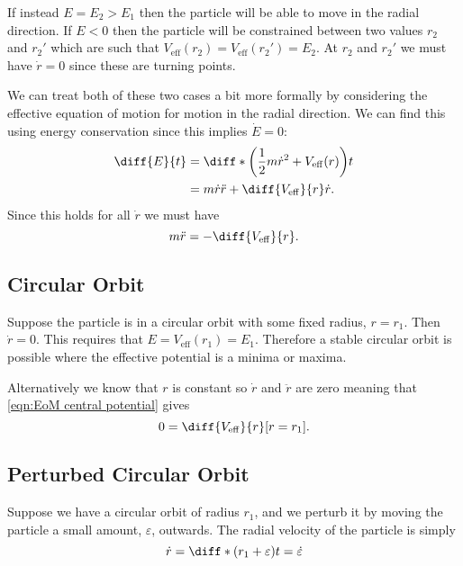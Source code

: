 \documentclass[fleqn]{NotesClass}
\newcommand*{\eff}{\mathrm{eff}}
\begin{document}
    If instead \(E = E_2 > E_1\) then the particle will be able to move in the radial direction.
    If \(E < 0\) then the particle will be constrained between two values \(r_2\) and \(r_2'\) which are such that \(V_{\eff}(r_2) = V_{\eff}(r_2') = E_2\).
    At \(r_2\) and \(r_2'\) we must have \(\dot{r} = 0\) since these are turning points.
    
    We can treat both of these two cases a bit more formally by considering the effective equation of motion for motion in the radial direction.
    We can find this using energy conservation since this implies \(\dot{E} = 0\):
    \begin{align}
        \diff{E}{t} &= \diff*{\left( \frac{1}{2}m\dot{r}^2 + V_{\eff}(r) \right)}{t}\\
        &= m\dot{r}\ddot{r} + \diff{V_{\eff}}{r}\dot{r}.
    \end{align}
    Since this holds for all \(\dot{r}\) we must have
    \begin{equation}
        m\ddot{r} = -\diff{V_{\eff}}{r}.\label{eqn:EoM central potential}
    \end{equation}
    
    \subsection{Circular Orbit}
    Suppose the particle is in a circular orbit with some fixed radius, \(r = r_1\).
    Then \(\dot{r} = 0\).
    This requires that \(E = V_{\eff}(r_1) = E_1\).
    Therefore a stable circular orbit is possible where the effective potential is a minima or maxima.
    
    Alternatively we know that \(r\) is constant so \(\dot{r}\) and \(\ddot{r}\) are zero meaning that \cref{eqn:EoM central potential} gives
    \begin{equation}
        0=\diff{V_{\eff}}{r}[r=r_1].
    \end{equation}
    
    \subsection{Perturbed Circular Orbit}
    Suppose we have a circular orbit of radius \(r_1\), and we perturb it by moving the particle a small amount, \(\varepsilon\), outwards.
    The radial velocity of the particle is simply
    \begin{equation}
        \dot{r} = \diff*{(r_1 + \varepsilon)}{t} = \dot{\varepsilon}
    \end{equation}
\end{document}
